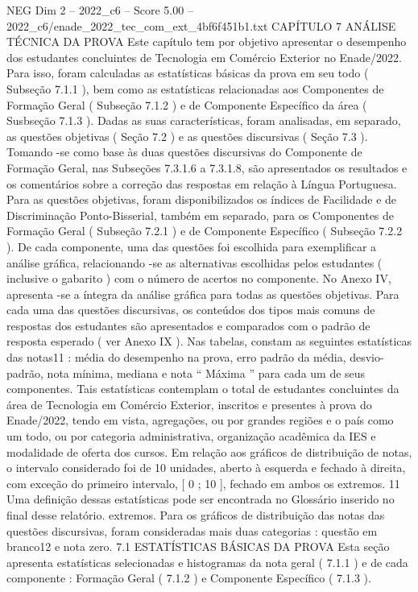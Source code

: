 \begin{textsample}{NEG Dim 2 – 2022\_c6 – Score 5.00 – 2022\_c6/enade\_2022\_tec\_com\_ext\_4bf6f451b1.txt}  \label{ex:f2_neg_304}
CAPÍTULO 7 ANÁLISE TÉCNICA DA PROVA Este capítulo tem por objetivo apresentar o desempenho dos estudantes concluintes de Tecnologia em Comércio Exterior no Enade/2022.
Para isso, foram calculadas as estatísticas básicas da prova em seu todo ( Subseção 7.1.1 ), bem como as estatísticas relacionadas aos Componentes de Formação Geral ( Subseção 7.1.2 ) e de Componente Específico da área ( Susbseção 7.1.3 ).
Dadas as suas características, foram analisadas, em separado, as questões objetivas ( Seção 7.2 ) e as questões discursivas ( Seção 7.3 ).
Tomando -se como base às duas questões discursivas do Componente de Formação Geral, nas Subseções 7.3.1.6 a 7.3.1.8, são apresentados os resultados e os comentários sobre a correção das respostas em relação à Língua Portuguesa.
Para as questões objetivas, foram disponibilizados os índices de Facilidade e de Discriminação Ponto-Bisserial, também em separado, para os Componentes de Formação Geral ( Subseção 7.2.1 ) e de Componente Específico ( Subseção 7.2.2 ).
De cada componente, uma das questões foi escolhida para exemplificar a análise gráfica, relacionando -se as alternativas escolhidas pelos estudantes ( inclusive o gabarito ) com o número de acertos no componente.
No Anexo IV, apresenta -se a íntegra da análise gráfica para todas as questões objetivas.
Para cada uma das questões discursivas, os conteúdos dos tipos mais comuns de respostas dos estudantes são apresentados e comparados com o padrão de resposta esperado ( ver Anexo IX ).
Nas tabelas, constam as seguintes estatísticas das notas11 : média do desempenho na prova, erro padrão da média, desvio-padrão, nota mínima, mediana e nota “ Máxima ” para cada um de seus componentes.
Tais estatísticas contemplam o total de estudantes concluintes da área de Tecnologia em Comércio Exterior, inscritos e presentes à prova do Enade/2022, tendo em vista, agregações, ou por grandes regiões e o país como um todo, ou por categoria administrativa, organização acadêmica da IES e modalidade de oferta dos cursos.
Em relação aos gráficos de distribuição de notas, o intervalo considerado foi de 10 unidades, aberto à esquerda e fechado à direita, com exceção do primeiro intervalo, [ 0 ; 10 ], fechado em ambos os extremos. 11 Uma definição dessas estatísticas pode ser encontrada no Glossário inserido no final desse relatório. extremos.
Para os gráficos de distribuição das notas das questões discursivas, foram consideradas mais duas categorias : questão em branco12 e nota zero. 7.1 ESTATÍSTICAS BÁSICAS DA PROVA Esta seção apresenta estatísticas selecionadas e histogramas da nota geral ( 7.1.1 ) e de cada componente : Formação Geral ( 7.1.2 ) e Componente Específico ( 7.1.3 ).

\end{textsample}
